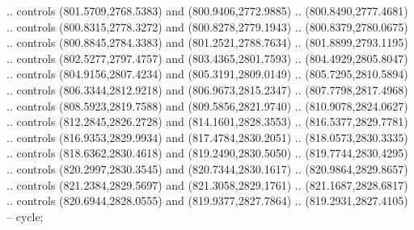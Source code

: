 \begin{scope}[shift={(296.85925,-6.26562)}]
\begin{scope}[shift={(-138.30846,-2572.6617)}]
\begin{scope}
        .. controls (801.5709,2768.5383) and (800.9406,2772.9885) ..
        (800.8490,2777.4681) .. controls (800.8315,2778.3272) and (800.8278,2779.1943)
        .. (800.8379,2780.0675) .. controls (800.8845,2784.3383) and
        (801.2521,2788.7634) .. (801.8899,2793.1195) .. controls (802.5277,2797.4757)
        and (803.4365,2801.7593) .. (804.4929,2805.8047) .. controls
        (804.9156,2807.4234) and (805.3191,2809.0149) .. (805.7295,2810.5894) ..
        controls (806.3344,2812.9218) and (806.9673,2815.2347) .. (807.7798,2817.4968)
        .. controls (808.5923,2819.7588) and (809.5856,2821.9740) ..
        (810.9078,2824.0627) .. controls (812.2845,2826.2728) and (814.1601,2828.3553)
        .. (816.5377,2829.7781) .. controls (816.9353,2829.9934) and
        (817.4784,2830.2051) .. (818.0573,2830.3335) .. controls (818.6362,2830.4618)
        and (819.2490,2830.5050) .. (819.7744,2830.4295) .. controls
        (820.2997,2830.3545) and (820.7344,2830.1617) .. (820.9864,2829.8657) ..
        controls (821.2384,2829.5697) and (821.3058,2829.1761) .. (821.1687,2828.6817)
        .. controls (820.6944,2828.0555) and (819.9377,2827.7864) ..
        (819.2931,2827.4105) -- cycle;


\end{scope}
\end{scope}
\end{scope}
